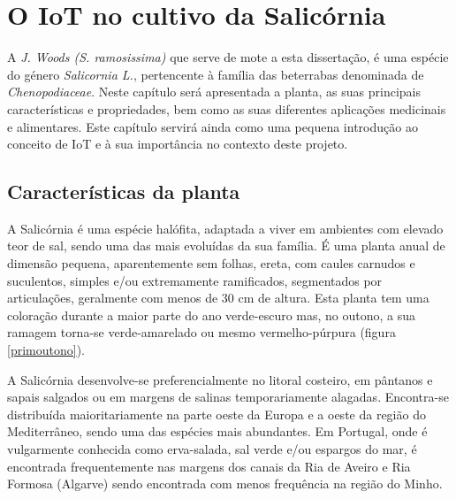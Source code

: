 
\chapter{O \acl{IoT} no cultivo da Salicórnia}

 A \sr \space \textit{J. Woods (S. ramosissima)}\cite{JoaoSilva} que serve de mote a esta dissertação, é uma espécie do género \textit{Salicornia L.}, pertencente à família das beterrabas denominada de \textit{Chenopodiaceae}\cite{chenopodiaceae}.  Neste capítulo será apresentada a planta, as suas principais características e propriedades, bem como as suas diferentes aplicações medicinais e alimentares. Este capítulo servirá ainda como uma pequena introdução ao conceito de \ac{IoT} e à sua  importância no contexto deste projeto.


\section{Características da planta}


A Salicórnia é uma espécie halófita, adaptada a viver em ambientes com elevado teor de sal\cite{ferri}, sendo uma das mais evoluídas da sua família. É uma planta anual de dimensão pequena, aparentemente sem folhas, ereta, com caules carnudos e suculentos, simples e/ou extremamente ramificados, segmentados por articulações\cite{Silva2000}, geralmente com menos de 30 cm de altura\cite{overviewsal}. Esta planta tem uma coloração durante a maior parte do ano verde-escuro mas, no outono, a sua ramagem torna-se verde-amarelado ou mesmo vermelho-púrpura (figura \ref{primoutono})\cite{Silva2000}.





A Salicórnia desenvolve-se preferencialmente no litoral costeiro, em pântanos e sapais salgados ou em margens de salinas temporariamente alagadas. Encontra-se distribuída maioritariamente na parte oeste da Europa e a oeste da região do Mediterrâneo, sendo uma das espécies mais abundantes\cite{Figueroa1987}. Em Portugal, onde é vulgarmente conhecida como erva-salada, sal verde e/ou espargos do mar\cite{RaquelPinto}, é encontrada frequentemente nas margens dos canais da Ria de Aveiro e Ria Formosa (Algarve)\cite{RaquelPinto} sendo encontrada com menos frequência na região do Minho\cite{Silva2000}. 

\newpage

